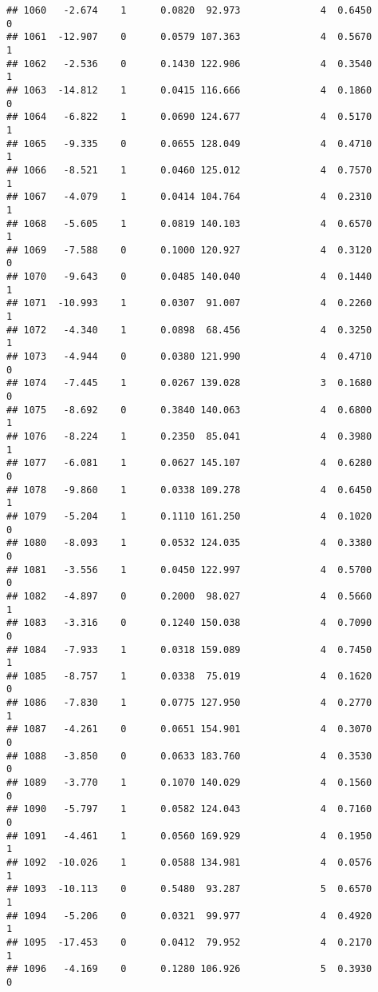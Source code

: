 \documentclass[
]{article}
\begin{document}
\begin{verbatim}
## 1060   -2.674    1      0.0820  92.973              4  0.6450      0
## 1061  -12.907    0      0.0579 107.363              4  0.5670      1
## 1062   -2.536    0      0.1430 122.906              4  0.3540      1
## 1063  -14.812    1      0.0415 116.666              4  0.1860      0
## 1064   -6.822    1      0.0690 124.677              4  0.5170      1
## 1065   -9.335    0      0.0655 128.049              4  0.4710      1
## 1066   -8.521    1      0.0460 125.012              4  0.7570      1
## 1067   -4.079    1      0.0414 104.764              4  0.2310      1
## 1068   -5.605    1      0.0819 140.103              4  0.6570      1
## 1069   -7.588    0      0.1000 120.927              4  0.3120      0
## 1070   -9.643    0      0.0485 140.040              4  0.1440      1
## 1071  -10.993    1      0.0307  91.007              4  0.2260      1
## 1072   -4.340    1      0.0898  68.456              4  0.3250      1
## 1073   -4.944    0      0.0380 121.990              4  0.4710      0
## 1074   -7.445    1      0.0267 139.028              3  0.1680      0
## 1075   -8.692    0      0.3840 140.063              4  0.6800      1
## 1076   -8.224    1      0.2350  85.041              4  0.3980      1
## 1077   -6.081    1      0.0627 145.107              4  0.6280      0
## 1078   -9.860    1      0.0338 109.278              4  0.6450      1
## 1079   -5.204    1      0.1110 161.250              4  0.1020      0
## 1080   -8.093    1      0.0532 124.035              4  0.3380      0
## 1081   -3.556    1      0.0450 122.997              4  0.5700      0
## 1082   -4.897    0      0.2000  98.027              4  0.5660      1
## 1083   -3.316    0      0.1240 150.038              4  0.7090      0
## 1084   -7.933    1      0.0318 159.089              4  0.7450      1
## 1085   -8.757    1      0.0338  75.019              4  0.1620      0
## 1086   -7.830    1      0.0775 127.950              4  0.2770      1
## 1087   -4.261    0      0.0651 154.901              4  0.3070      0
## 1088   -3.850    0      0.0633 183.760              4  0.3530      0
## 1089   -3.770    1      0.1070 140.029              4  0.1560      0
## 1090   -5.797    1      0.0582 124.043              4  0.7160      0
## 1091   -4.461    1      0.0560 169.929              4  0.1950      1
## 1092  -10.026    1      0.0588 134.981              4  0.0576      1
## 1093  -10.113    0      0.5480  93.287              5  0.6570      1
## 1094   -5.206    0      0.0321  99.977              4  0.4920      1
## 1095  -17.453    0      0.0412  79.952              4  0.2170      1
## 1096   -4.169    0      0.1280 106.926              5  0.3930      0

\end{verbatim}
\end{document}
